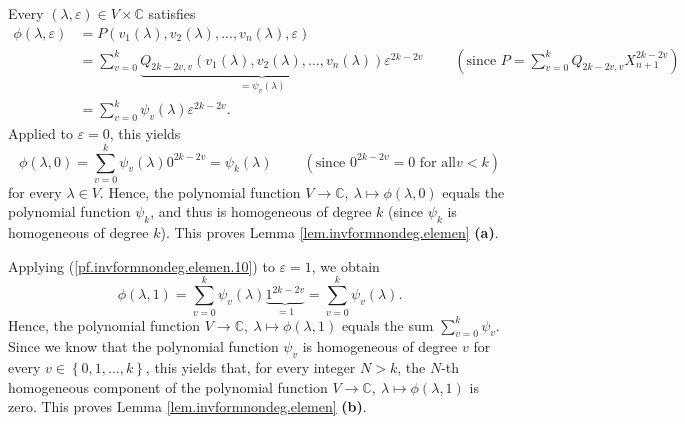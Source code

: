 \documentclass[etingof-lie.tex]{subfiles}
\begin{document}
Every $\left(  \lambda,\varepsilon\right)  \in V\times\mathbb{C}$ satisfies%
\begin{align}
\phi\left(  \lambda,\varepsilon\right)   &  =P\left(  v_{1}\left(
\lambda\right)  ,v_{2}\left(  \lambda\right)  ,...,v_{n}\left(  \lambda
\right)  ,\varepsilon\right) \nonumber\\
&  =\sum\limits_{v=0}^{k}\underbrace{Q_{2k-2v,v}\left(  v_{1}\left(
\lambda\right)  ,v_{2}\left(  \lambda\right)  ,...,v_{n}\left(  \lambda
\right)  \right)  }_{=\psi_{v}\left(  \lambda\right)  }\varepsilon
^{2k-2v}\ \ \ \ \ \ \ \ \ \ \left(  \text{since }P=\sum\limits_{v=0}%
^{k}Q_{2k-2v,v}X_{n+1}^{2k-2v}\right) \nonumber\\
&  =\sum\limits_{v=0}^{k}\psi_{v}\left(  \lambda\right)  \varepsilon^{2k-2v}.
\label{pf.invformnondeg.elemen.10}%
\end{align}
Applied to $\varepsilon=0$, this yields%
\[
\phi\left(  \lambda,0\right)  =\sum\limits_{v=0}^{k}\psi_{v}\left(
\lambda\right)  0^{2k-2v}=\psi_{k}\left(  \lambda\right)
\ \ \ \ \ \ \ \ \ \ \left(  \text{since }0^{2k-2v}=0\text{ for all
}v<k\right)
\]
for every $\lambda\in V$. Hence, the polynomial function $V\rightarrow
\mathbb{C},\ \lambda\mapsto\phi\left(  \lambda,0\right)  $ equals the
polynomial function $\psi_{k}$, and thus is homogeneous of degree $k$ (since
$\psi_{k}$ is homogeneous of degree $k$). This proves Lemma
\ref{lem.invformnondeg.elemen} \textbf{(a)}.

Applying (\ref{pf.invformnondeg.elemen.10}) to $\varepsilon=1$, we obtain%
\[
\phi\left(  \lambda,1\right)  =\sum\limits_{v=0}^{k}\psi_{v}\left(
\lambda\right)  \underbrace{1^{2k-2v}}_{=1}=\sum\limits_{v=0}^{k}\psi
_{v}\left(  \lambda\right)  .
\]
Hence, the polynomial function $V\rightarrow\mathbb{C},\ \lambda\mapsto
\phi\left(  \lambda,1\right)  $ equals the sum $\sum\limits_{v=0}^{k}\psi_{v}%
$. Since we know that the polynomial function $\psi_{v}$ is homogeneous of
degree $v$ for every $v\in\left\{  0,1,...,k\right\}  $, this yields that, for
every integer $N>k$, the $N$-th homogeneous component of the polynomial
function $V\rightarrow\mathbb{C},\ \lambda\mapsto\phi\left(  \lambda,1\right)
$ is zero. This proves Lemma \ref{lem.invformnondeg.elemen} \textbf{(b)}.
\end{document}
